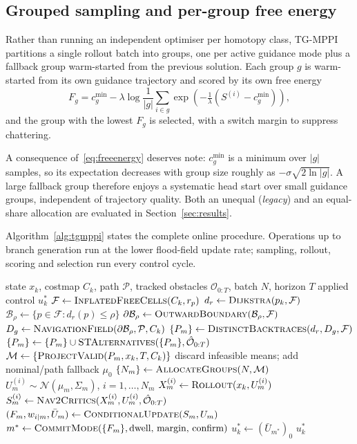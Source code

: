\documentclass[journal]{IEEEtran}
\begin{document}
\subsection{Grouped sampling and per-group free energy}
Rather than running an independent optimiser per homotopy class, TG-MPPI
partitions a single rollout batch into groups, one per active guidance mode plus
a fallback group warm-started from the previous solution. Each group $g$ is
warm-started from its own guidance trajectory and scored by its own free energy
\begin{equation}
  F_g = c^{\min}_g - \lambda \log \frac{1}{|g|}\sum_{i \in g}
        \exp\!\left(-\tfrac{1}{\lambda}\left(S^{(i)} - c^{\min}_g\right)\right),
  \label{eq:freeenergy}
\end{equation}
and the group with the lowest $F_g$ is selected, with a switch margin to
suppress chattering.

A consequence of~\eqref{eq:freeenergy} deserves note: $c^{\min}_g$ is a minimum
over $|g|$ samples, so its expectation decreases with group size roughly as
$-\sigma\sqrt{2\ln|g|}$. A large fallback group therefore enjoys a systematic
head start over small guidance groups, independent of trajectory quality. Both
an unequal (\emph{legacy}) and an equal-share allocation are evaluated in
Section~\ref{sec:results}.

Algorithm~\ref{alg:tgmppi} states the complete online procedure. Operations up
to branch generation run at the lower flood-field update rate; sampling,
rollout, scoring and selection run every control cycle.

\begin{algorithm}[t]
\caption{Topology-Guided Grouped MPPI}
\label{alg:tgmppi}
\begin{algorithmic}[1]
\Require state $x_k$, costmap $C_k$, path $\mathcal P$, tracked obstacles
$\hat{\mathcal O}_{0:T}$, batch $N$, horizon $T$
\Ensure applied control $u_k^*$
\State $\mathcal F\gets\Call{InflatedFreeCells}{C_k,r_p}$
\State $d_r\gets\Call{Dijkstra}{p_k,\mathcal F}$
\State $\mathcal B_\rho\gets\{p\in\mathcal F:d_r(p)\leq\rho\}$
\State $\partial\mathcal B_\rho\gets\Call{OutwardBoundary}{\mathcal B_\rho,\mathcal F}$
\State $D_g\gets\Call{NavigationField}{\partial\mathcal B_\rho,\mathcal P,C_k}$
\State $\{P_m\}\gets\Call{DistinctBacktraces}{d_r,D_g,\mathcal F}$
\State $\{P_m\}\gets\{P_m\}\cup
\Call{STAlternatives}{\{P_m\},\hat{\mathcal O}_{0:T}}$
\State $\mathcal M\gets\{\Call{ProjectValid}{P_m,x_k,T,C_k}\}$
\State discard infeasible means; add nominal/path fallback $\mu_0$
\State $\{N_m\}\gets\Call{AllocateGroups}{N,\mathcal M}$
  \State $U_m^{(i)}\sim\mathcal N(\mu_m,\Sigma_m)$, $i=1,\ldots,N_m$
  \State $X_m^{(i)}\gets\Call{Rollout}{x_k,U_m^{(i)}}$
  \State $S_m^{(i)}\gets\Call{Nav2Critics}{X_m^{(i)},U_m^{(i)},\hat{\mathcal O}_{0:T}}$
  \State $(F_m,w_{i\mid m},\bar U_m)\gets\Call{ConditionalUpdate}{S_m,U_m}$
\EndFor
\State $m^*\gets\Call{CommitMode}{\{F_m\},\text{dwell, margin, confirm}}$
\State $u_k^*\gets(\bar U_{m^*})_0$
\State \Return $u_k^*$
\end{algorithmic}
\end{algorithm}
\end{document}
